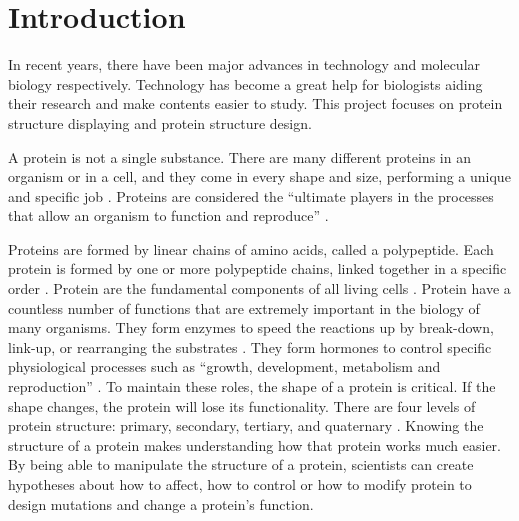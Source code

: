 \chapter{Introduction}
\label{ch:intro}

In recent years, there have been major advances in technology and molecular biology respectively. Technology has become a great help for biologists aiding their research and make contents easier to study. This project focuses on protein structure displaying and protein structure design.

A protein is not a single substance. There are many different proteins in an organism or in a cell, and they come in every shape and size, performing a unique and specific job \parencite{noauthor_introduction_nodate}. Proteins are considered the ``ultimate players in the processes that allow an organism to function and reproduce'' \parencite{stephenson_protein_2016}.

Proteins are formed by linear chains of amino acids, called a polypeptide. Each protein is formed by one or more polypeptide chains, linked together in a specific order \parencite{noauthor_introduction_nodate}. Protein are the fundamental components of all living cells \parencite{hutchison_protein_2013}. Protein have a countless number of functions that are extremely important in the biology of many organisms. They form enzymes to speed the reactions up by break-down, link-up, or rearranging the substrates \parencite{noauthor_introduction_nodate}. They form hormones to control specific physiological processes such as ``growth, development, metabolism and reproduction'' \parencite{noauthor_introduction_nodate}. To maintain these roles, the shape of a protein is critical. If the shape changes, the protein will lose its functionality. There are four levels of protein structure: primary, secondary, tertiary, and quaternary \parencite{noauthor_introduction_nodate}.
Knowing the structure of a protein makes understanding how that protein works much easier. By being able to manipulate the structure of a protein, scientists can create hypotheses about how to affect, how to control or how to modify protein to design mutations and change a protein's function. 

